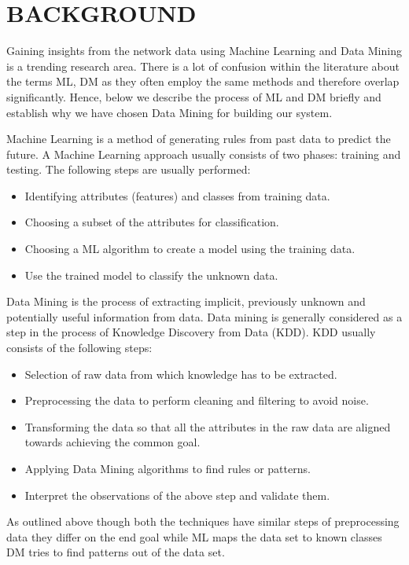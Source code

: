 
\chapter{BACKGROUND}

Gaining insights from the network data using Machine Learning and Data Mining is a trending research area. There is a lot of confusion within the literature about the terms ML, DM as they often employ the same methods and therefore overlap significantly. Hence, below we describe the process of ML and DM briefly and establish why we have chosen Data Mining for building our system.

Machine Learning is a method of generating rules from past data to predict the future.
A Machine Learning approach usually consists of two phases:
training and testing. The following steps are usually performed:
\begin{itemize}
	\item Identifying attributes (features) and classes from training data.
	\item Choosing a subset of the attributes for classification.
	\item Choosing a ML algorithm to create a model using the training data.
	\item Use the trained model to classify the unknown data.
\end{itemize}	

Data Mining is the process of extracting implicit, previously unknown and potentially useful information from data. Data mining is generally considered as a step in the process of Knowledge Discovery from Data (KDD). KDD usually consists of the following steps:
\begin{itemize}
	\item Selection of raw data from which knowledge has to be extracted.
	\item Preprocessing the data to perform cleaning and filtering to avoid noise.
	\item Transforming the data so that all the attributes in the raw data are aligned towards achieving the common goal. 
	\item Applying Data Mining algorithms to find rules or patterns.
	\item Interpret the observations of the above step and validate them.
	
\end{itemize}

As outlined above though both the techniques have similar steps of preprocessing data they differ on the end goal while ML maps the data set to known classes DM tries to find patterns out of the data set.

